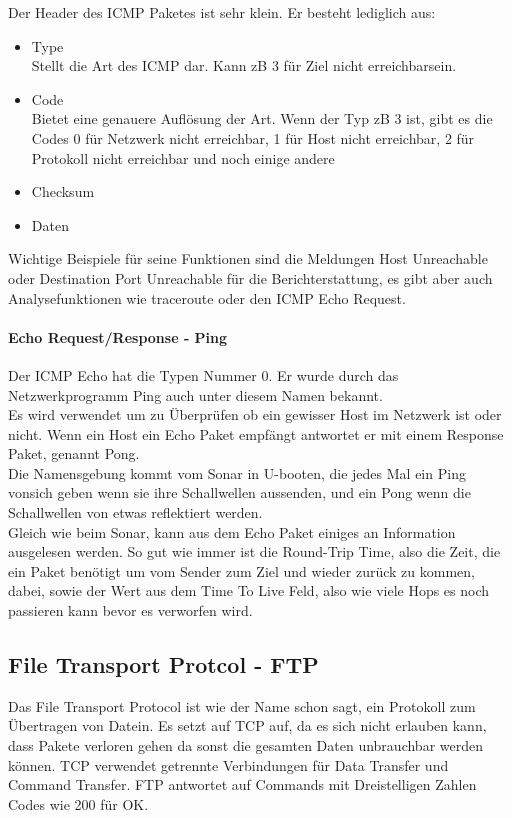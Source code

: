 \documentclass[11pt,a4paper]{report}
\begin{document}
Der Header des ICMP Paketes ist sehr klein. Er besteht lediglich aus:
\begin{itemize}
\item Type\\
Stellt die Art des ICMP dar. Kann zB 3 für \glqq Ziel nicht erreichbar\grqq  sein.
\item Code\\
Bietet eine genauere Auflösung der Art. Wenn der Typ zB 3 ist, gibt es die Codes 0 für Netzwerk nicht erreichbar, 1 für Host nicht erreichbar, 2 für Protokoll nicht erreichbar und noch einige andere
\item Checksum
\item Daten
\end{itemize}

Wichtige Beispiele für seine Funktionen sind die Meldungen Host Unreachable oder Destination Port Unreachable für die Berichterstattung, es gibt aber auch Analysefunktionen wie traceroute oder den ICMP Echo Request. 
\paragraph{Echo Request/Response - Ping}
Der ICMP Echo hat die Typen Nummer 0. Er wurde durch das Netzwerkprogramm Ping auch unter diesem Namen bekannt.\\
Es wird verwendet um zu Überprüfen ob ein gewisser Host im Netzwerk ist oder nicht. Wenn ein Host ein Echo Paket empfängt antwortet er mit einem Response Paket, genannt Pong.\\

Die Namensgebung kommt vom Sonar in U-booten, die jedes Mal ein Ping vonsich geben wenn sie ihre Schallwellen aussenden, und ein Pong wenn die Schallwellen von etwas reflektiert werden.\\ 
Gleich wie beim Sonar, kann aus dem Echo Paket einiges an Information ausgelesen werden. So gut wie immer ist die Round-Trip Time, also die Zeit, die ein Paket benötigt um vom Sender zum Ziel und wieder zurück zu kommen, dabei, sowie der Wert aus dem Time To Live Feld, also wie viele Hops es noch passieren kann bevor es verworfen wird.
\subsection{File Transport Protcol - FTP}
Das File Transport Protocol ist wie der Name schon sagt, ein Protokoll zum Übertragen von Datein. Es setzt auf TCP auf, da es sich nicht erlauben kann, dass 
Pakete verloren gehen da sonst die gesamten Daten unbrauchbar werden können. TCP verwendet getrennte Verbindungen für Data Transfer und Command Transfer. FTP 
antwortet auf Commands mit Dreistelligen Zahlen Codes wie 200 für OK.\\
\end{document}
